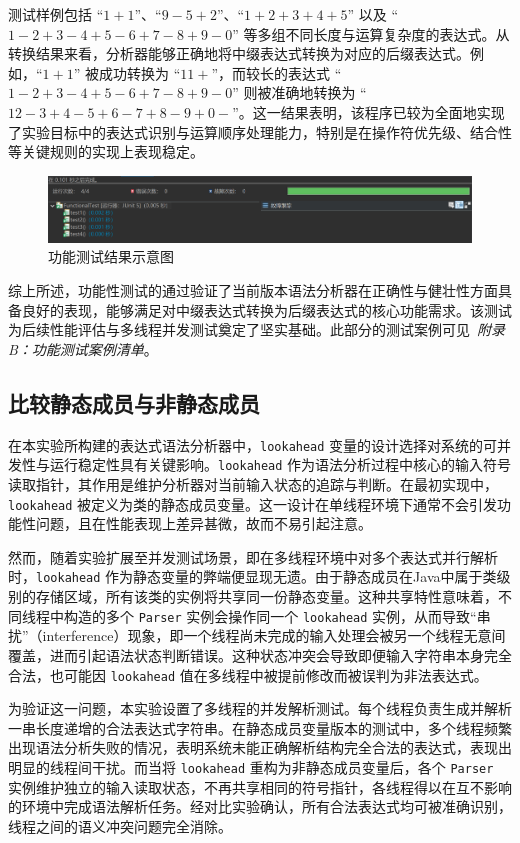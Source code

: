 \documentclass[a4paper, twoside, utf8]{ctexart}
\begin{document}
    测试样例包括 “$1+1$”、“$9-5+2$”、“$1+2+3+4+5$” 以及 “$1-2+3-4+5-6+7-8+9-0$” 等多组不同长度与运算复杂度的表达式。从转换结果来看，分析器能够正确地将中缀表达式转换为对应的后缀表达式。例如，“$1+1$” 被成功转换为 “$1 1 +$”，而较长的表达式 “$1-2+3-4+5-6+7-8+9-0$” 则被准确地转换为 “$1 2 - 3 + 4 - 5 + 6 - 7 + 8 - 9 + 0 -$”。这一结果表明，该程序已较为全面地实现了实验目标中的表达式识别与运算顺序处理能力，特别是在操作符优先级、结合性等关键规则的实现上表现稳定。

    \begin{figure}[htbp]
        \centering
        \includegraphics[width=0.8\linewidth]{figure/FunctionalTest.png}
        \caption{功能测试结果示意图}
    \end{figure}

    综上所述，功能性测试的通过验证了当前版本语法分析器在正确性与健壮性方面具备良好的表现，能够满足对中缀表达式转换为后缀表达式的核心功能需求。该测试为后续性能评估与多线程并发测试奠定了坚实基础。此部分的测试案例可见\ \textit{附录B：功能测试案例清单}。

    \subsection{比较静态成员与非静态成员}

    在本实验所构建的表达式语法分析器中，\verb|lookahead| 变量的设计选择对系统的可并发性与运行稳定性具有关键影响。\verb|lookahead| 作为语法分析过程中核心的输入符号读取指针，其作用是维护分析器对当前输入状态的追踪与判断。在最初实现中，\verb|lookahead| 被定义为类的静态成员变量。这一设计在单线程环境下通常不会引发功能性问题，且在性能表现上差异甚微，故而不易引起注意。

    然而，随着实验扩展至并发测试场景，即在多线程环境中对多个表达式并行解析时，\verb|lookahead| 作为静态变量的弊端便显现无遗。由于静态成员在Java中属于类级别的存储区域，所有该类的实例将共享同一份静态变量。这种共享特性意味着，不同线程中构造的多个 \verb|Parser| 实例会操作同一个 \verb|lookahead| 实例，从而导致“串扰”（interference）现象，即一个线程尚未完成的输入处理会被另一个线程无意间覆盖，进而引起语法状态判断错误。这种状态冲突会导致即便输入字符串本身完全合法，也可能因 \verb|lookahead| 值在多线程中被提前修改而被误判为非法表达式。

    为验证这一问题，本实验设置了多线程的并发解析测试。每个线程负责生成并解析一串长度递增的合法表达式字符串。在静态成员变量版本的测试中，多个线程频繁出现语法分析失败的情况，表明系统未能正确解析结构完全合法的表达式，表现出明显的线程间干扰。而当将 \verb|lookahead| 重构为非静态成员变量后，各个 \verb|Parser| 实例维护独立的输入读取状态，不再共享相同的符号指针，各线程得以在互不影响的环境中完成语法解析任务。经对比实验确认，所有合法表达式均可被准确识别，线程之间的语义冲突问题完全消除。
\end{document}
